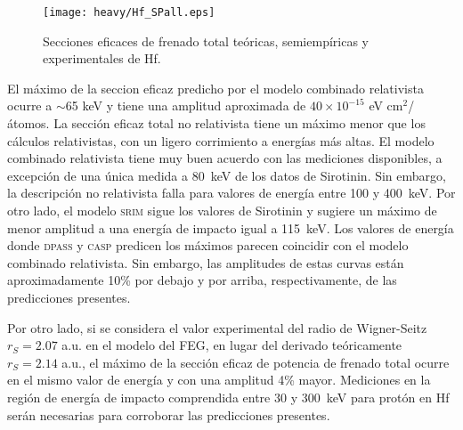 \begin{figure}[t]
\centering
\texttt{[image: heavy/Hf\_SPall.eps]}
\caption[Secciones eficaces teóricas, semiempíricas y experimentales de 
Hf.]{Secciones eficaces de frenado total teóricas, semiempíricas y
experimentales de Hf.}
\label{fig:Hf_SPall}
\end{figure}

El máximo de la seccion eficaz predicho por el modelo combinado 
relativista ocurre a $\sim$65 keV y tiene una amplitud aproximada de 
$40\times 10^{-15}$ eV cm$^2$/átomos. La sección eficaz total no 
relativista tiene un máximo menor que los cálculos relativistas, con un
ligero corrimiento a energías más altas. El modelo combinado relativista 
tiene muy buen acuerdo con las mediciones disponibles, a excepción de 
una única medida a 80~keV de los datos de Sirotinin. Sin embargo, la 
descripción no relativista falla para valores de energía entre 100 y 
400~keV. Por otro lado, el modelo \textsc{srim} sigue los valores de 
Sirotinin y sugiere un máximo de menor amplitud a una energía de impacto 
igual a 115~keV. 
Los valores de energía donde \textsc{dpass} y \textsc{casp} predicen los 
máximos parecen coincidir con el modelo combinado relativista. Sin 
embargo, las amplitudes de estas curvas están aproximadamente 10\% por 
debajo y por arriba, respectivamente, de las predicciones presentes. 

Por otro lado, si se considera el valor experimental del radio de 
Wigner-Seitz $r_S=2.07$ a.u. en el modelo del FEG, en lugar del derivado 
teóricamente $r_S=2.14$ a.u., el máximo de la sección eficaz de potencia 
de frenado total ocurre en el mismo valor de energía y con una amplitud 
4\% mayor.
Mediciones en la región de energía de impacto comprendida entre 30 y 
300~keV para protón en Hf serán necesarias para corroborar las 
predicciones presentes. 


